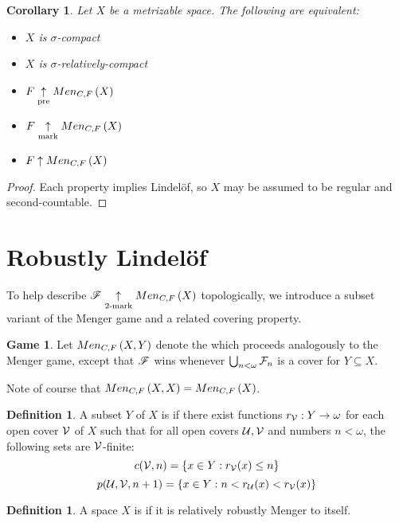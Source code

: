 \documentclass{amsart}
\newtheorem{corollary}[theorem]{Corollary}
\theoremstyle{definition}
\newtheorem{definition}[theorem]{Definition}
\newtheorem{game}[theorem]{Game}
\begin{document}
\begin{corollary}
  Let \(X\) be a metrizable space. The following are equivalent:
  \begin{itemize}
    \item \(X\) is \(\sigma\)-compact
    \item \(X\) is \(\sigma\)-relatively-compact
    \item \(F \underset{\text{pre}}{\uparrow} Men_{C,F}\left({X}\right)\)
    \item \(F \underset{\text{mark}}{\uparrow} Men_{C,F}\left({X}\right)\)
    \item \(F \uparrow Men_{C,F}\left({X}\right)\)
  \end{itemize}
\end{corollary}

\begin{proof}
  Each property implies Lindel\"of, so \(X\) may be assumed to be
  regular and second-countable.
\end{proof}



\section{Robustly Lindel\"of}

To help describe \(\mathscr{F}\underset{2\text{-mark}}{\uparrow}Men_{C,F}\left({X}\right)\) topologically, we introduce a
subset variant of the Menger game and a related covering property.

\begin{game}
  Let \(Men_{C,F}\left({X,Y}\right)\) denote the  which proceeds
  analogously to the Menger game, except that \(\mathscr{F}\) wins whenever
  \(\bigcup_{n<\omega} \mathcal{F}_n\) is a cover for \(Y\subseteq X\).
\end{game}

Note of course that \(Men_{C,F}\left({X,X}\right)=Men_{C,F}\left({X}\right)\).

\begin{definition}
  A subset \(Y\) of \(X\) is  if there exist
  functions \(r_{\mathcal{V}}:Y\to\omega\)
  for each open cover \(\mathcal{V}\) of \(X\) such that
  for all open covers \(\mathcal{U},\mathcal{V}\) and numbers \(n<\omega\),
  the following sets are \(\mathcal{V}\)-finite:
    \[
      c(\mathcal{V},n)=\{ x\in Y : r_{\mathcal{V}}(x)\leq n\}
    \]
    \[
      p(\mathcal{U},\mathcal{V},n+1)=\{ x\in Y : n<r_{\mathcal{U}}(x)<r_{\mathcal{V}}(x)\}
    \]
\end{definition}

\begin{definition}
  A space \(X\) is  if it is relatively robustly
  Menger to itself.
\end{definition}
\end{document}
